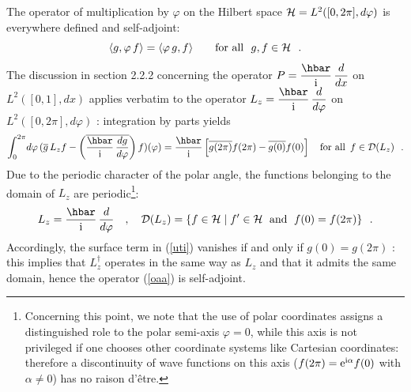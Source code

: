 \documentclass[12pt]{report}
\def\underline{\relax}
\begin{document}
\underline{{\bf (5)}}
The operator of multiplication by $\varphi$ on the Hilbert space 
${\cal H} = L^2
([0,2 \pi ], d\varphi )$ 
is everywhere defined and self-adjoint: 
\[
\langle g , \varphi \, f \rangle
 = \langle  \varphi \, g , f \rangle \qquad \mbox{for all} \ \
g,f \in {\cal H}
\ \ .
\]
The discussion in section 2.2.2
concerning the operator $P = \ds{\hbar \over \ri} \,
\ds{d \over dx}$ on 
$L^2
([0,1], dx )$ applies verbatim  to the operator 
$L_z = \ds{\hbar \over \ri} \,
\ds{d \over d\varphi}$ on 
$L^2
([0,2 \pi ], d\varphi )$ : integration by parts yields
\begin{equation}
\label{uti}
\int_0^{2\pi} \! d \varphi \, (  \overline{g} \, L_z f
-
\left( \overline{\ds{\hbar \over \ri} \,
\ds{dg \over d\varphi} }  \right)  f ) (\varphi )
= \ds{\hbar \over \ri} \left[ \overline{g(2 \pi)} f (2 \pi) -
\overline{g( 0)} f (0) \right]
\quad \mbox{for all} \ \, f \in {\cal D}(L_z)
\ \ .
\end{equation}
Due to the periodic character of the polar angle, 
the functions belonging to the domain of $L_z$
are periodic\footnote{Concerning this point, we note that 
the use of polar coordinates assigns a distinguished role to 
the polar semi-axis $\varphi =0$, while this axis is not privileged 
if one chooses other coordinate systems like Cartesian 
coordinates: 
therefore a discontinuity of wave functions on this axis 
($f(2 \pi)= {\rm e}^{{\rm i} \alpha}
f(0)$ with 
$\alpha \neq 0$)
has no raison d'\^etre.}:
\begin{equation}
\label{oaa}
L_z = \ds{\hbar \over \ri} \, \ds{d \over d\varphi} \quad , \quad
{\cal D} (L_z ) = \{ f \in \hs \; | \;
f^{\prime} \in \hs \ \; {\rm and} \ \; f(0) = f(2 \pi ) \}
\ \ .
\end{equation}
Accordingly, the surface term in (\ref{uti}) vanishes
if and only if $g(0) = g(2 \pi)$ :
this implies that $L_z^{\dag}$ operates in the same way as $L_z$
and that it admits the same domain, hence 
the operator (\ref{oaa}) is self-adjoint. 
\end{document}
